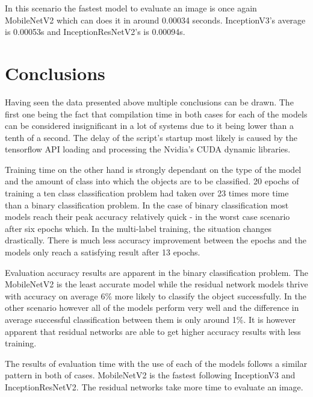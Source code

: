 \documentclass{ijisa}
\begin{document}
In this scenario the fastest model to evaluate an image is once again MobileNetV2 which can does it in around 0.00034 seconds. InceptionV3's average is 0.00053s and InceptionResNetV2's is 0.00094s.

\section{Conclusions}

Having seen the data presented above multiple conclusions can be drawn. The first one being the fact that compilation time in both cases for each of the models can be considered insignificant in a lot of systems due to it being lower than a tenth of a second. The delay of the script's startup most likely is caused by the tensorflow API loading and processing the Nvidia's CUDA dynamic libraries. 

Training time on the other hand is strongly dependant on the type of the model and the amount of class into which the objects are to be classified. 20 epochs of training a ten class classification problem had taken over 23 times more time than a binary classification problem. In the case of binary classification most models reach their peak accuracy relatively quick - in the worst case scenario after six epochs which. In the multi-label training, the situation changes drastically. There is much less accuracy improvement between the epochs and the models only reach a satisfying result after 13 epochs. 

Evaluation accuracy results are apparent in the binary classification problem. The MobileNetV2 is the least accurate model while the residual network models thrive with accuracy on average 6\% more likely to classify the object successfully. In the other scenario however all of the models perform very well and the difference in average successful classification between them is only around 1\%. It is however apparent that residual networks are able to get higher accuracy results with less training. 

The results of evaluation time with the use of each of the models follows a similar pattern in both of cases. MobileNetV2 is the fastest following InceptionV3 and InceptionResNetV2. The residual networks take more time to evaluate an image.



\end{document}
